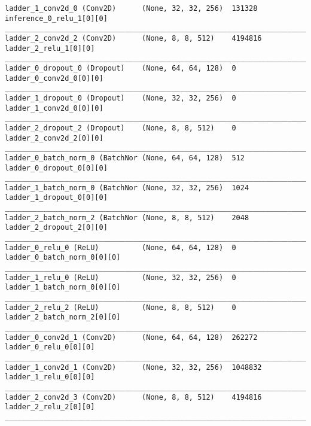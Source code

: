\begin{lstlisting}[caption={CelebA-\ac{VLAE} Encoder},captionpos=b,basicstyle=\tiny, label={lst:celeba-vlae-encoder}]
ladder_1_conv2d_0 (Conv2D)      (None, 32, 32, 256)  131328      inference_0_relu_1[0][0]
__________________________________________________________________________________________________
ladder_2_conv2d_2 (Conv2D)      (None, 8, 8, 512)    4194816     ladder_2_relu_1[0][0]
__________________________________________________________________________________________________
ladder_0_dropout_0 (Dropout)    (None, 64, 64, 128)  0           ladder_0_conv2d_0[0][0]
__________________________________________________________________________________________________
ladder_1_dropout_0 (Dropout)    (None, 32, 32, 256)  0           ladder_1_conv2d_0[0][0]
__________________________________________________________________________________________________
ladder_2_dropout_2 (Dropout)    (None, 8, 8, 512)    0           ladder_2_conv2d_2[0][0]
__________________________________________________________________________________________________
ladder_0_batch_norm_0 (BatchNor (None, 64, 64, 128)  512         ladder_0_dropout_0[0][0]
__________________________________________________________________________________________________
ladder_1_batch_norm_0 (BatchNor (None, 32, 32, 256)  1024        ladder_1_dropout_0[0][0]
__________________________________________________________________________________________________
ladder_2_batch_norm_2 (BatchNor (None, 8, 8, 512)    2048        ladder_2_dropout_2[0][0]
__________________________________________________________________________________________________
ladder_0_relu_0 (ReLU)          (None, 64, 64, 128)  0           ladder_0_batch_norm_0[0][0]
__________________________________________________________________________________________________
ladder_1_relu_0 (ReLU)          (None, 32, 32, 256)  0           ladder_1_batch_norm_0[0][0]
__________________________________________________________________________________________________
ladder_2_relu_2 (ReLU)          (None, 8, 8, 512)    0           ladder_2_batch_norm_2[0][0]
__________________________________________________________________________________________________
ladder_0_conv2d_1 (Conv2D)      (None, 64, 64, 128)  262272      ladder_0_relu_0[0][0]
__________________________________________________________________________________________________
ladder_1_conv2d_1 (Conv2D)      (None, 32, 32, 256)  1048832     ladder_1_relu_0[0][0]
__________________________________________________________________________________________________
ladder_2_conv2d_3 (Conv2D)      (None, 8, 8, 512)    4194816     ladder_2_relu_2[0][0]
__________________________________________________________________________________________________

\end{lstlisting}
